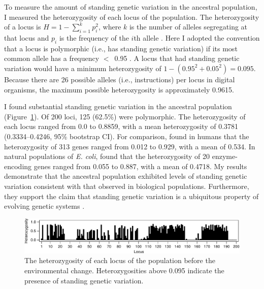 \begin{doublespace}
To measure the amount of standing genetic variation
in the ancestral population,
I measured the heterozygosity of each locus of the population.
%
The heterozygosity of a locus is $H = 1 - \sum_{i = 1}^{k} p_i^{2}$,
where $k$ is the number of alleles segregating at that locus
and $p_i$ is the frequency of the $i$th allele \citep[p.~15]{gil04}.
%
Here I adopted the convention that a locus
is polymorphic (i.e., has standing genetic variation)
if its most common allele has a frequency $<$~0.95 \citep[p.~53]{har97}.
%
A locus that had standing genetic variation
would have a minimum heterozygosity of
$1 - (0.95^{2} + 0.05^{2}) = 0.095$.
%
Because there are 26 possible alleles (i.e., instructions)
per locus in digital organisms,
the maximum possible heterozygosity is approximately 0.9615.



I found substantial standing genetic variation
in the ancestral population (Figure~\ref{heterozygosity-plot}).
%
Of 200 loci, 125 (62.5\%) were polymorphic.
%
The heterozygosity of each locus ranged from 0.0 to 0.8859,
with a mean heterozygosity of 0.3781 (0.3334--0.4246, 95\% bootstrap CI).
%
For comparison, \citet{ste01} found in humans
that the heterozygosity of 313 genes
ranged from 0.012 to 0.929, with a mean of 0.534.
%
In natural populations of \emph{E. coli}, \citet{sel80} found
that the heterozygosity of 20 enzyme-encoding genes
ranged from 0.055 to 0.887, with a mean of 0.4718.
%
My results demonstrate that the ancestral population
exhibited levels of standing genetic variation
consistent with that observed in biological populations.
%
Furthermore, they support the claim that standing genetic variation
is a ubiquitous property of evolving genetic systems \citep{gib04,bar08}.



\begin{figure}[b!]
\begin{center}
\includegraphics[width=\linewidth]{heterozygosity-plot.pdf}
\caption{The heterozygosity of each locus
  of the population before the environmental change.
  Heterozygosities above 0.095 indicate
  the presence of standing genetic variation.}
\label{heterozygosity-plot}
\end{center}
\end{figure}




\end{doublespace}
